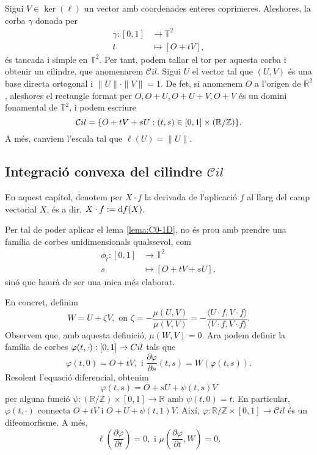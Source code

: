Sigui $V\in\ker(\ell)$ un vector amb coordenades enteres coprimeres. Aleshores, la corba $\gamma$ donada per 
\begin{align}
    \nonumber\gamma:[0,1]&\to\mathbb T^2\\
    \nonumber t&\mapsto [O+tV],
\end{align}
és tancada i simple en $\mathbb T^2$. Per tant, podem tallar el tor per aquesta corba i obtenir un cilindre, que anomenarem $\mathcal Cil$. Sigui $U$ el vector tal que $(U,V)$ és una base directa ortogonal i $\|U\|\cdot\|V\|=1$. De fet, si anomenem $O$ a l'origen de $\mathbb R^2$, aleshores el rectangle format per $O, O+U, O+U+V, O+V$ és un domini fonamental de $\mathbb T^2$, i podem escriure 
\begin{equation*}
    \mathcal Cil = \{O+tV+sU : (t,s)\in[0,1]\times(\mathbb R / \mathbb Z)\}.
\end{equation*}
A més, canviem l'escala tal que $\ell(U)=\|U\|$.

\subsection{Integració convexa del cilindre $\mathcal Cil$}
\begin{nota}
    En aquest capítol, denotem per $X\cdot f$ la derivada de l'aplicació $f$ al llarg del camp vectorial $X$, és a dir, $X\cdot f := \text df(X)$.
\end{nota}
Per tal de poder aplicar el lema \ref{lema:C0-1D}, no és prou amb prendre una família de corbes unidimensionals qualssevol, com
\begin{align}
    \nonumber\phi_t:[0,1]&\to\mathbb T^2\\
    \nonumber s&\mapsto [O+tV+sU],
\end{align}
sinó que haurà de ser una mica més elaborat. 

En concret, definim 
\begin{equation*}
    W=U+\zeta V, \text{ on } \zeta = -\frac{\mu(U,V)}{\mu(V,V)} = -\frac{\langle U\cdot f, V\cdot f\rangle}{\langle V\cdot f, V\cdot f\rangle}.
\end{equation*}
Observem que, amb aquesta definició, $\mu(W,V)=0$. Ara podem definir la família de corbes $\varphi(t,\cdot):[0,1]\to\mathbb \mathcal Cil$ tals que 
\begin{equation*}
    \varphi(t,0) = O + tV, \text{ i } \frac{\partial\varphi}{\partial s}(t,s) = W(\varphi(t,s)).
\end{equation*}
Resolent l'equació diferencial, obtenim
\begin{equation*}
    \varphi(t,s) = O + sU + \psi(t,s)V
\end{equation*}
per alguna funció $\psi:(\mathbb R/\mathbb Z)\times[0,1]\to\mathbb R$ amb $\psi(t,0)=t$. En particular, $\varphi(t,\cdot)$ connecta $O+tV$ i $O+U+\psi(t,1)V$. Així, $\varphi:\mathbb R/\mathbb Z\times[0,1]\to\mathcal Cil$ és un difeomorfisme. A més, 
\begin{equation*}
    \ell\left( \frac{\partial\varphi}{\partial t} \right) = 0, \text{ i } \mu\left( \frac{\partial\varphi}{\partial t}, W \right) = 0.
\end{equation*}

